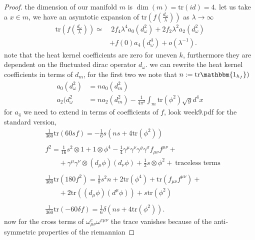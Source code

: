 \begin{proof}
     the dimension of our manifold $m$ is $\dim(m) = \text{tr}(id) =4 $. let us
     take a $x \in m$, we have an asymtotic expansion of
     $\text{tr}(f(\frac{d_\omega}{\lambda}))$ as $\lambda \rightarrow \infty$
     \begin{align}
         \text{tr}(f(\frac{d_\omega}{\lambda})) \simeq& \ 2f_4 \lambda ^4
         a_0(d_\omega ^2)+ 2f_2\lambda^2 a_2(d_\omega^2) \\&+ f(0) a_4(d_\omega^4)
         +o(\lambda^{-1}).
     \end{align}
     note that the heat kernel coefficients are zero for uneven $k$,
     furthermore they are dependent on the fluctuated dirac operator
     $d_\omega$. we can rewrite the heat kernel coefficients in terms of $d_m$,
     for the first two we note that $n:= \text{tr}\mathbbm{1_{h_f}})$
     \begin{align}
         a_0(d_\omega^2) &= na_0(d_m^2)\\
         a_2(d_\omega^2 &= na_2(d_m^2) - \frac{1}{4\pi^2}\int_m
         \text{tr}(\phi^2)\sqrt{g}d^4x
     \end{align}
     for $a_4$ we need to extend in terms of coefficients of $f$, look week9.pdf
     for the standard version,
     \begin{align}
         &\frac{1}{360}\text{tr}(60sf)= -\frac{1}{6}s(ns + 4
         \text{tr}(\phi^2))\\
        \nonumber\\
         &f^2 = \frac{1}{16}s^2\otimes 1 + 1\otimes \phi^4 - \frac{1}{4}
         \gamma^\mu\gamma^\nu \gamma^\varrho\gamma^\sigma f_{\mu\nu}f^{\mu\nu}+\\
         &\;\;\;\;\;\;\;+\gamma^\mu\gamma^\nu\otimes(d_\mu\phi)(d_\nu
         \phi)+\frac{1}{2}s\otimes \phi^2 + \ \text{traceless terms}\\
         \nonumber\\
         &\frac{1}{360}\text{tr}(180f^2) = \frac{1}{8}s^2n + 2\text{tr}(\phi^4)
         + \text{tr}(f_{\mu\nu}f^{\mu\nu}) +\\
         &\;\;\;\;\;\;\;+2\text{tr}((d_\mu\phi)(d^\mu\phi))
         + s\text{tr}(\phi^2)\\
         \nonumber\\
         &\frac{1}{360}\text{tr}(-60\delta f)=
         \frac{1}{6}\delta(ns+4\text{tr}(\phi^2)).
     \end{align}
     now for the cross terms of $\omega_{\mu\nu}^e\omega^{e\mu\nu}$  the trace
     vanishes because of the anti-symmetric properties of the riemannian

\end{proof}
